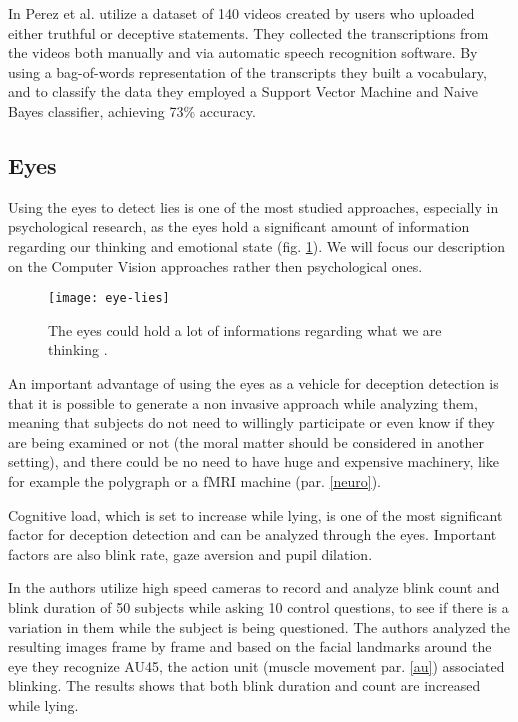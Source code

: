 In \cite{Mihalcea:2013:ADD:2522848.2522888} Perez et al. utilize a dataset of 140 videos created by users who uploaded either truthful or deceptive statements. They collected the transcriptions from the videos both manually and via automatic speech recognition software. By using a bag-of-words representation of the transcripts they built a vocabulary, and to classify the data they employed a Support Vector Machine and Naive Bayes classifier, achieving 73\% accuracy.

\clearpage
 
\subsection{Eyes}
Using the eyes to detect lies is one of the most studied approaches, especially in psychological research, as the eyes hold a significant amount of information regarding our thinking and emotional state \cite{FUKUDA2001239} (fig. \ref{fig:eye-lies}). We will focus our description on the Computer Vision approaches rather then psychological ones.

\begin{figure}[H]
	\centering
	\texttt{[image: eye-lies]}
	\caption{The eyes could hold a lot of informations regarding what we are thinking \cite{eyeLies}.}
	\label{fig:eye-lies}
\end{figure}

An important advantage of using the eyes as a vehicle for deception detection is that it is possible to generate a non invasive approach while analyzing them, meaning that subjects do not need to willingly participate or even know if they are being examined or not (the moral matter should be considered in another setting), and there could be no need to have huge and expensive machinery, like for example the polygraph or a fMRI machine (par. \ref{neuro}).

Cognitive load, which is set to increase while lying, is one of the most significant factor for deception detection and can be analyzed through the eyes. Important factors are also blink rate, gaze aversion and pupil dilation.

In \cite{8125844} the authors utilize high speed cameras to record and analyze blink count and blink duration of 50 subjects while asking 10 control questions, to see if there is a variation in them while the subject is being questioned. The authors analyzed the resulting images frame by frame and based on the facial landmarks around the eye they recognize AU45, the action unit (muscle movement par. \ref{au}) associated blinking. The results shows that both blink duration and count are increased while lying.


